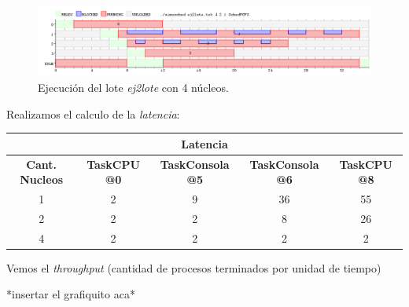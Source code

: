 \begin{figure}[!h]
	\begin{center}
		\includegraphics[width=500px]{imagenes/ej2_4.png}
		\caption{Ejecución del lote \emph{ej2lote} con 4 núcleos.}
		\label{fig:grafico_ej2_4}
	\end{center}
\end{figure}

\newpage
Realizamos el calculo de la \textit{latencia}:

\begin{center}
	\begin{tabular}{|c|c|c|c|c|}
		\hline
		\multicolumn{5}{|c|}{\textbf{Latencia}} \\
		\hline
		\textbf{Cant. Nucleos} & \textbf{TaskCPU @0} & \textbf{TaskConsola @5} & \textbf{TaskConsola @6} & \textbf{TaskCPU @8} \\
		\hline
		1 & 2 & 9 & 36 & 55 \\
		2 & 2 & 2 & 8 & 26 \\
		4 & 2 & 2 & 2 & 2 \\
		\hline
	\end{tabular}
\end{center}

Vemos el \textit{throughput} (cantidad de procesos terminados por unidad de tiempo)

*insertar el grafiquito aca*

